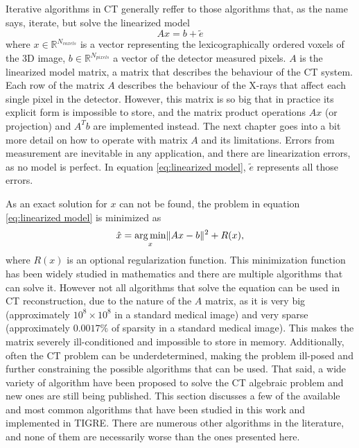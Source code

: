 Iterative algorithms in CT generally reffer to those algorithms that, as the name says, iterate, but solve the linearized model 
\begin{equation}
Ax=b+\tilde{e} \label{eq:linearized model}
\end{equation}
 where $x\in \mathbb{R}^{N_{voxels}}$ is a vector representing the lexicographically ordered voxels of the 3D image, $b\in \mathbb{R}^{N_{pixels}} $ a vector of the detector measured pixels. $A$ is the linearized model matrix, a matrix that describes the behaviour of the CT system. Each row of the matrix $A$ describes the behaviour of the X-rays that affect each single pixel in the detector. However, this matrix is so big that in practice its explicit form is impossible to store, and the matrix product operations $Ax$ (or projection) and $A^Tb$ are implemented instead. The next chapter goes into a bit more detail on how to operate with matrix $A$ and its limitations. Errors from measurement are inevitable in any application, and there are linearization errors, as no model is perfect. In equation \ref{eq:linearized model}, $\tilde{e}$ represents all those errors.

As an exact solution for $x$ can not be found, the problem in equation \ref{eq:linearized model} is minimized as
\begin{equation}
\hat{x}=\mathop{\mathrm{arg\,min}}_x \lVert Ax-b\rVert^2+R(x),\label{eq:THE equation}
\end{equation}
 where $R(x)$ is an optional regularization function. This minimization function has been widely studied in mathematics and there are multiple algorithms that can solve it. However not all algorithms that solve the equation can be used in CT reconstruction, due to the nature of the $A$ matrix, as it is very big (approximately $10^8\times 10^8$ in a standard medical image) and very sparse (approximately $0.0017\%$ of sparsity in a standard medical image). This makes the matrix severely ill-conditioned and impossible to store in memory. Additionally, often the CT problem can be underdetermined, making the problem ill-posed and further constraining the possible algorithms that can be used. That said, a wide variety of algorithm have been proposed to solve the CT algebraic problem and new ones are still being published. This section discusses a few of the available and most common algorithms that have been studied in this work and implemented in TIGRE. There are numerous other algorithms in the literature, and none of them are necessarily worse than the ones presented here.


